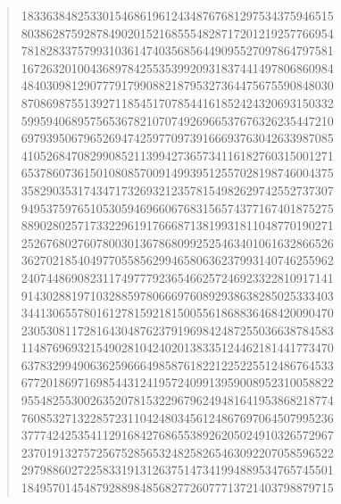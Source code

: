 \documentclass[oneside,12pt]{book}   	%
\theoremstyle{definition}
\begin{document}
\begin{spacing}{1.618}
\begin{quote}
18336384825330154686196124348767681297534375946515 \\
80386287592878490201521685554828717201219257766954 \\
78182833757993103614740356856449095527097864797581 \\
16726320100436897842553539920931837441497806860984 \\
48403098129077791799088218795327364475675590848030 \\
87086987551392711854517078544161852424320693150332 \\
59959406895756536782107074926966537676326235447210 \\
69793950679652694742597709739166693763042633987085 \\
41052684708299085211399427365734116182760315001271 \\
65378607361501080857009149939512557028198746004375 \\
35829035317434717326932123578154982629742552737307 \\
94953759765105305946966067683156574377167401875275 \\
88902802571733229619176668713819931811048770190271 \\
25267680276078003013678680992525463401061632866526 \\
36270218540497705585629946580636237993140746255962 \\
24074486908231174977792365466257246923322810917141 \\
91430288197103288597806669760892938638285025333403 \\
34413065578016127815921815005561868836468420090470 \\
23053081172816430487623791969842487255036638784583 \\
11487696932154902810424020138335124462181441773470 \\
63783299490636259666498587618221225225512486764533 \\
67720186971698544312419572409913959008952310058822 \\
95548255300263520781532296796249481641953868218774 \\
76085327132285723110424803456124867697064507995236 \\
37774242535411291684276865538926205024910326572967 \\
23701913275725675285653248258265463092207058596522 \\
29798860272258331913126375147341994889534765745501 \\
18495701454879288984856827726077713721403798879715 \\

\end{quote}
\end{spacing}
\end{document}
